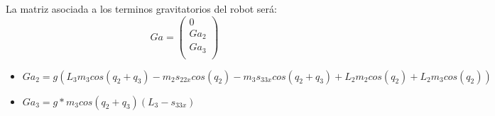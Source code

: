 La matriz asociada a los terminos gravitatorios del robot será:
	\[
	Ga=
	\begin{pmatrix}
	0\\
	Ga_{2}\\
	Ga_{3}\\
	\end{pmatrix} \]

	\begin{itemize}
		\item $Ga_{2}=g(L_{3}m_{3}cos(q_{2}+q_{3})-m_{2}s_{22x}cos(q_{2})-m_{3}s_{33x}cos(q_{2}+q_{3})+L_{2}m_{2}cos(q_{2})+L_{2}m_{3}cos(q_{2})) $ \\ \vspace{0.1cm}
		\item $Ga_{3}=g*m_{3}cos(q_{2}+q_{3})(L_{3}-s_{33x})$ \\
	\end{itemize}
